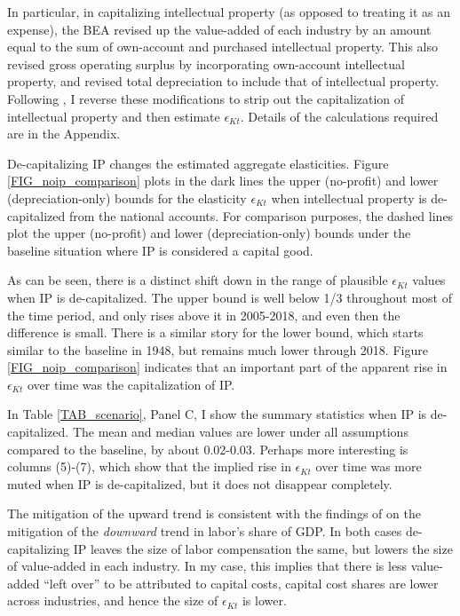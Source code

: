 \documentclass[11pt]{article}
\begin{document}
In particular, in capitalizing intellectual property (as opposed to treating it as an expense), the BEA revised up the value-added of each industry by an amount equal to the sum of own-account and purchased intellectual property. This also revised gross operating surplus by incorporating own-account intellectual property, and revised total depreciation to include that of intellectual property. Following \cite{ksz2020}, I reverse these modifications to strip out the capitalization of intellectual property and then estimate $\epsilon_{Kt}$. Details of the calculations required are in the Appendix.

De-capitalizing IP changes the estimated aggregate elasticities. Figure \ref{FIG_noip_comparison} plots in the dark lines the upper (no-profit) and lower (depreciation-only) bounds for the elasticity $\epsilon_{Kt}$ when intellectual property is de-capitalized from the national accounts. For comparison purposes, the dashed lines plot the upper (no-profit) and lower (depreciation-only) bounds under the baseline situation where IP is considered a capital good. 

As can be seen, there is a distinct shift down in the range of plausible $\epsilon_{Kt}$ values when IP is de-capitalized. The upper bound is well below 1/3 throughout most of the time period, and only rises above it in 2005-2018, and even then the difference is small. There is a similar story for the lower bound, which starts similar to the baseline in 1948, but remains much lower through 2018. Figure \ref{FIG_noip_comparison} indicates that an important part of the apparent rise in $\epsilon_{Kt}$ over time was the capitalization of IP. 

In Table \ref{TAB_scenario}, Panel C, I show the summary statistics when IP is de-capitalized. The mean and median values are lower under all assumptions compared to the baseline, by about 0.02-0.03. Perhaps more interesting is columns (5)-(7), which show that the implied rise in $\epsilon_{Kt}$ over time was more muted when IP is de-capitalized, but it does not disappear completely. 

The mitigation of the upward trend is consistent with the findings of \cite{ksz2020} on the mitigation of the \textit{downward} trend in labor's share of GDP. In both cases de-capitalizing IP leaves the size of labor compensation the same, but lowers the size of value-added in each industry. In my case, this implies that there is less value-added ``left over'' to be attributed to capital costs, capital cost shares are lower across industries, and hence the size of $\epsilon_{Kt}$ is lower. 
\end{document}
